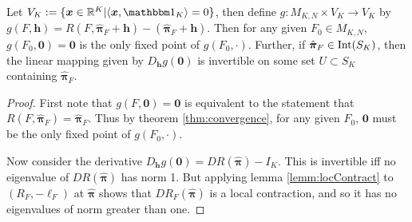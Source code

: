 \begin{cor}\label{lemm:locInvert}
	Let \( V_K\defined\{\bm x\in\R^K|\<\bm x,\mathbbm 1_K\>=0\} \), then define \( g:M_{K,N}\times V_K\rightarrow V_K \) by \( g(F,\bm h) = R(F,\hat{\bm \pi}_F+\bm h)-(\hat{\bm \pi}_F+\bm h). \) Then for any given \( F_0\in M_{K,N} \), \( g(F_0,\bm 0) =\bm 0 \) is the only fixed point of \( g(F_0,\cdotp) \). Further, if \( \hat{\bm \pi}_F\in\operatorname{Int}(S_K) \), then the linear mapping given by \( D_{\bm h}g(\bm 0) \) is invertible on some set \( U\subset S_K \) containing \( \hat{\bm \pi}_F \).
\end{cor}
\begin{proof}
	First note that \( g(F,\bm 0) = \bm 0 \) is equivalent to the statement that \( R(F,\hat{\bm \pi}_F)=\hat{\bm \pi}_F \). Thus by theorem \ref{thm:convergence}, for any given \( F_0 \), \( \bm 0 \) must be the only fixed point of \( g(F_0,\cdot) \).
	
	Now consider the derivative \( D_{\bm h}g(\bm 0) = DR(\hat{\bm \pi}) -I_K \).  This is invertible iff no eigenvalue of \( DR(\hat{\bm \pi}) \) has norm 1.  But applying lemma \ref{lemm:locContract} to \( (R_F,-\ell_F) \) at \( \hat{\bm \pi} \) shows that \( DR_F(\hat{\bm \pi}) \) is a local contraction, and so it has no eigenvalues of norm greater than one.
\end{proof}	
%	
%	


